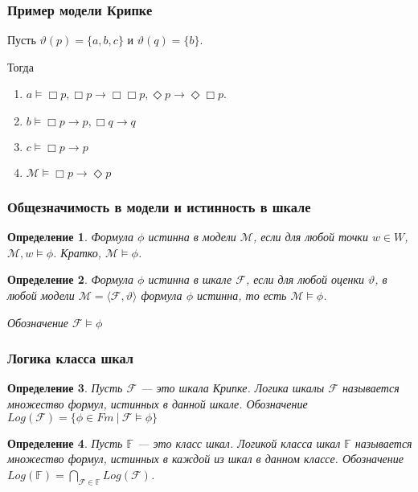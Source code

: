 \documentclass[pdf,utf8,russian,aspectratio=169]{beamer}
\newtheorem{defin}{Определение}
\begin{document}
\begin{frame}
  \frametitle{Пример модели Крипке}


Пусть $\vartheta(p) = \{ a, b, c \}$ и $\vartheta(q) = \{ b \}$.

Тогда
\begin{enumerate}
\item $a \models \Box p, \Box p \to \Box \Box p, \Diamond p \to \Diamond \Box p$.
\item $b \models \Box p \to p, \Box q \to q$
\item $c \models \Box p \to p$
\item $\mathcal{M} \models \Box p \to \Diamond p$
\end{enumerate}
\end{frame}

\begin{frame}
  \frametitle{Общезначимость в модели и истинность в шкале}

  \begin{defin}
    Формула $\phi$ \emph{истинна в модели} $\mathcal{M}$, если для любой точки $w \in W$, $\mathcal{M}, w \models \phi$.
    Кратко, $\mathcal{M} \models \phi$.
  \end{defin}

  \begin{defin}
    Формула $\phi$ \emph{истинна в шкале} $\mathcal{F}$, если для любой оценки $\vartheta$, в любой модели $\mathcal{M} = \langle \mathcal{F}, \vartheta \rangle$ формула $\phi$ истинна, то есть $\mathcal{M} \models \phi$.

    Обозначение $\mathcal{F} \models \phi$
  \end{defin}
\end{frame}

\begin{frame}
  \frametitle{Логика класса шкал}

  \begin{defin}
    Пусть $\mathcal{F}$ --- это шкала Крипке. \emph{Логика} шкалы $\mathcal{F}$ называется множество формул, истинных в данной шкале. Обозначение $Log(\mathcal{F}) = \{ \phi \in Fm \: | \: \mathcal{F} \models \phi \}$
  \end{defin}

  \begin{defin}
    Пусть $\mathbb{F}$ --- это класс шкал. \emph{Логикой класса шкал} $\mathbb{F}$ называется множество формул, истинных в каждой из шкал в данном классе. Обозначение $Log(\mathbb{F}) = \bigcap \limits_{\mathcal{F} \in \mathbb{F}} Log(\mathcal{F})$.
  \end{defin}
\end{frame}
\end{document}
